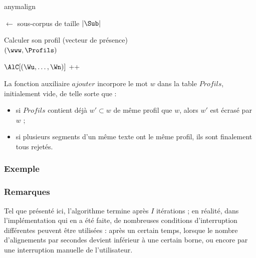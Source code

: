 \documentclass[a4paper,10pt]{article}
\begin{document}
\begin{algorithm}
\caption{anymalign \label{algoanym}}


\Debut
{
	{
		\Sub $\leftarrow$ sous-corpus de taille $|\Sub|$

		{
			{
				Calculer son profil (vecteur de présence) \\
				\ajouter$(\www,\Profils)$
			}

			{
				{

					$\AlC[(\Wu,\dots,\Wn)]$ ++
				}
			}
		}
	}
	\Retour \AlC
}
\end{algorithm}

La fonction auxiliaire $ajouter$ incorpore le mot $w$ dans la table $Profils$, initialement vide, de telle sorte que :

\begin{itemize}
\item si $Profils$ contient déjà $w'\subset w$ de même profil que $w$, alors $w'$ est écrasé par $w$ ;
\item si plusieurs segments d'un même texte ont le même profil, ils sont finalement tous rejetés.
\end{itemize}


\subsubsection{Exemple}

\subsubsection{Remarques}

Tel que présenté ici, l'algorithme termine après $I$ itérations ; en réalité, dans l'implémentation qui en a été faite, de nombreuses conditions d'interruption différentes peuvent être utilisées : après un certain temps, lorsque le nombre d'alignements par secondes devient inférieur à une certain borne, ou encore par une interruption manuelle de l'utilisateur.
\end{document}
